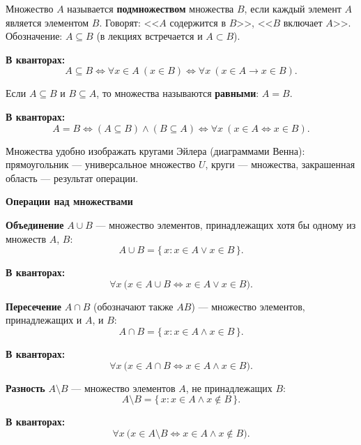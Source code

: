 \documentclass[a4paper,11pt]{article}
\newcommand{\kv}{\par\noindent\textbf{\textcolor{oprc!85!black}{В кванторах:}}}
\newcommand{\podr}[1]{\par\needspace{8\baselineskip}\medskip
  {\large\bfseries\textcolor{oprc!80!black}{#1}}\par\nopagebreak\smallskip}
\begin{document}
\begin{opr}[подмножество]
Множество $A$ называется \textbf{подмножеством} множества $B$, если каждый элемент $A$ является элементом $B$.
Говорят: <<$A$ содержится в $B$>>, <<$B$ включает $A$>>. Обозначение: $A \subseteq B$ (в лекциях встречается и $A \subset B$).
\kv
\[
  A \subseteq B \Leftrightarrow \forall x \in A\ (x \in B)
  \Leftrightarrow \forall x\ (x \in A \to x \in B).
\]
\end{opr}

\begin{opr}
Если $A \subseteq B$ и $B \subseteq A$, то множества называются \textbf{равными}: $A = B$.
\kv
\[
  A = B \Leftrightarrow (A \subseteq B) \wedge (B \subseteq A)
  \Leftrightarrow \forall x\ (x \in A \Leftrightarrow x \in B).
\]
\end{opr}

Множества удобно изображать кругами Эйлера (диаграммами Венна): прямоугольник --- универсальное
множество $U$, круги --- множества, закрашенная область --- результат операции.

\begin{center}
\end{center}

\podr{Операции над множествами}

\begin{opr}[объединение]
\textbf{Объединение} $A \cup B$ --- множество элементов, принадлежащих хотя бы одному из множеств $A$, $B$:
\[
  A \cup B = \{\, x : x \in A \vee x \in B \,\}.
\]
\kv
\[
  \forall x\ \bigl(x \in A \cup B \Leftrightarrow x \in A \vee x \in B\bigr).
\]
\end{opr}

\begin{opr}[пересечение]
\textbf{Пересечение} $A \cap B$ (обозначают также $AB$) --- множество элементов, принадлежащих и $A$, и $B$:
\[
  A \cap B = \{\, x : x \in A \wedge x \in B \,\}.
\]
\kv
\[
  \forall x\ \bigl(x \in A \cap B \Leftrightarrow x \in A \wedge x \in B\bigr).
\]
\end{opr}

\begin{opr}[разность]
\textbf{Разность} $A \setminus B$ --- множество элементов $A$, не принадлежащих $B$:
\[
  A \setminus B = \{\, x : x \in A \wedge x \notin B \,\}.
\]
\kv
\[
  \forall x\ \bigl(x \in A \setminus B \Leftrightarrow x \in A \wedge x \notin B\bigr).
\]
\end{opr}
\end{document}
